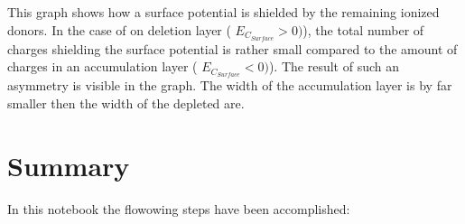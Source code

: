 \documentclass[11pt]{article}
\begin{document}
    \begin{Verbatim}[commandchars=\\\{\}]





    \end{Verbatim}

    \begin{center}
    \end{center}
    { \hspace*{\fill} \\}
    
    \begin{Verbatim}[commandchars=\\\{\}]





    \end{Verbatim}

    \begin{center}
    \end{center}
    { \hspace*{\fill} \\}
    
    \begin{Verbatim}[commandchars=\\\{\}]





    \end{Verbatim}

    This graph shows how a surface potential is shielded by the remaining
ionized donors. In the case of on deletion layer (
\(E_{C_{Surface}}>0 )\)), the total number of charges shielding the
surface potential is rather small compared to the amount of charges in
an accumulation layer ( \(E_{C_{Surface}}<0 )\)). The result of such an
asymmetry is visible in the graph. The width of the accumulation layer
is by far smaller then the width of the depleted are.

    \hypertarget{summary}{%
\section{Summary}\label{summary}}

In this notebook the flowowing steps have been accomplished:
\end{document}

